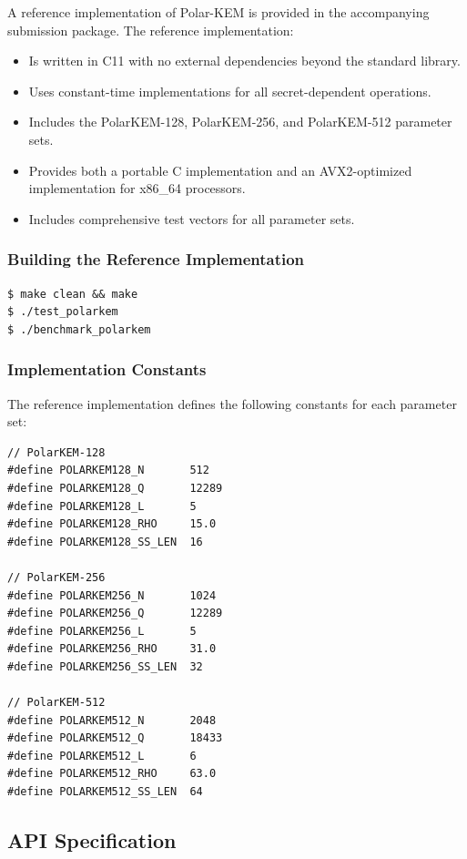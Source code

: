 \documentclass[11pt,a4paper]{article}
\newcommand{\polarKem}{\textsf{Polar-KEM}\xspace}
\begin{document}
A reference implementation of \polarKem is provided in the accompanying submission package. The reference implementation:

\begin{itemize}[leftmargin=2em]
\item Is written in C11 with no external dependencies beyond the standard library.
\item Uses constant-time implementations for all secret-dependent operations.
\item Includes the \textsf{PolarKEM-128}, \textsf{PolarKEM-256}, and \textsf{PolarKEM-512} parameter sets.
\item Provides both a portable C implementation and an AVX2-optimized implementation for x86\_64 processors.
\item Includes comprehensive test vectors for all parameter sets.
\end{itemize}

\subsubsection{Building the Reference Implementation}

\begin{verbatim}
$ make clean && make
$ ./test_polarkem
$ ./benchmark_polarkem
\end{verbatim}

\subsubsection{Implementation Constants}

The reference implementation defines the following constants for each parameter set:

\begin{verbatim}
// PolarKEM-128
#define POLARKEM128_N       512
#define POLARKEM128_Q       12289
#define POLARKEM128_L       5
#define POLARKEM128_RHO     15.0
#define POLARKEM128_SS_LEN  16

// PolarKEM-256
#define POLARKEM256_N       1024
#define POLARKEM256_Q       12289
#define POLARKEM256_L       5
#define POLARKEM256_RHO     31.0
#define POLARKEM256_SS_LEN  32

// PolarKEM-512
#define POLARKEM512_N       2048
#define POLARKEM512_Q       18433
#define POLARKEM512_L       6
#define POLARKEM512_RHO     63.0
#define POLARKEM512_SS_LEN  64
\end{verbatim}

\subsection{API Specification}\label{sec:api}
\end{document}
